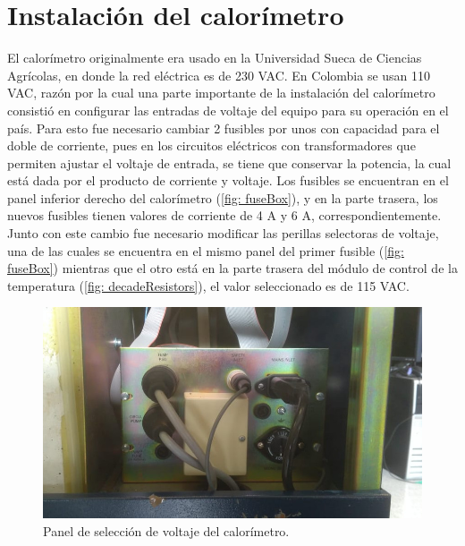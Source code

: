 
%




\chapter{Instalación del calorímetro}
	El calorímetro originalmente era usado en la Universidad Sueca de Ciencias Agrícolas, en donde la red eléctrica es de 230 VAC. En Colombia se usan 110 VAC, razón por la cual una parte importante de la instalación del calorímetro consistió en configurar las entradas de voltaje del equipo para su operación en el país. Para esto fue necesario cambiar 2 fusibles por unos con capacidad para el doble de corriente, pues en los circuitos eléctricos con transformadores que permiten ajustar el voltaje de entrada, se tiene que conservar la potencia, la cual está dada por el producto de corriente y voltaje. Los fusibles se encuentran en el panel inferior derecho del calorímetro (\autoref{fig: fuseBox}), y en la parte trasera, los nuevos fusibles tienen valores de corriente de 4 A y 6 A, correspondientemente. Junto con este cambio fue necesario modificar las perillas selectoras de voltaje, una de las cuales se encuentra en el mismo panel del primer fusible (\autoref{fig: fuseBox}) mientras que el otro está en la parte trasera del módulo de control de la temperatura (\autoref{fig: decadeResistors}), el valor seleccionado es de 115 VAC.
	\begin{figure}[h]
		\centering
		\includegraphics[width=0.7\linewidth]{Figures/fusepanel}
		\caption{Panel de selección de voltaje del calorímetro.}
		\label{fig: fuseBox}
	\end{figure}

